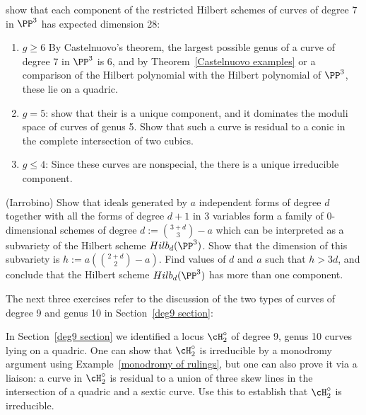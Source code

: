 \begin{exercise}\label{degree 7 analysis}
show that each component of the restricted Hilbert schemes of curves of degree 7
in $\PP^3$ has expected dimension 28:
\begin{enumerate}
 \item $g\geq 6$
By Castelnuovo's theorem, the largest possible genus of a curve of degree 7 in $\PP^3$ is 6, and 
by Theorem~\ref{Castelnuovo examples} or a comparison of the Hilbert polynomial
with the Hilbert polynomial of $\PP^3$, these lie on a quadric.
 \item $g=5$: show that their is a unique component, and it dominates the moduli space of curves of genus 5.
 Show that such a  curve is residual to a conic in the complete intersection of two cubics.
 \item $g\leq 4$: Since these curves are nonspecial, the there is a unique irreducible component.
\end{enumerate}
\end{exercise}


\begin{exercise}\label{bigger component}(Iarrobino)
Show that ideals generated by $a$ independent forms of degree $d$ together with all the forms of degree $d+1$ in 3 variables
form a family of 0-dimensional schemes of degree $d:={3+d\choose 3} -a$ which can be interpreted as a subvariety
of the Hilbert scheme $Hilb_d(\PP^3)$. Show that the dimension of this subvariety is $h := a({2+d\choose 2}-a)$. Find values of
$d$ and $a$ such that $h>3d$, and conclude that the Hilbert scheme $Hilb_d(\PP^3)$ has more than one component.
\end{exercise}

 The next three exercises refer to the discussion of the two types of curves of degree 9 and genus 10 in Section~\ref{deg9 section}:
\begin{exercise}\label{degree 9 type 2 is irreducible}
In Section~\ref{deg9 section} we identified a locus $\cH^\circ_2$ of degree 9, genus 10 curves lying on a quadric.
One can show that $\cH^\circ_2$  is irreducible by a monodromy argument using Example~\ref{monodromy of rulings}, but one can also prove it via a liaison:  a curve in $\cH^\circ_2$ is residual to a union of three skew lines in the intersection of a quadric and a sextic curve. Use this to establish that $\cH^\circ_2$ is irreducible.
\end{exercise}

